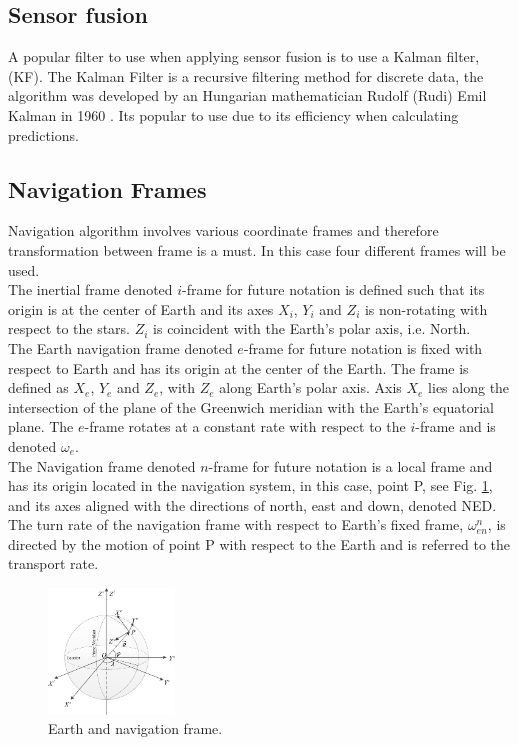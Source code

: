 \subsection{Sensor fusion}
A popular filter to use when applying sensor fusion is to use a Kalman filter, (KF). The Kalman Filter is a recursive filtering method for discrete data, the algorithm was developed by an Hungarian mathematician Rudolf (Rudi) Emil Kalman in 1960 \cite{boken}. Its popular to use due to its efficiency when calculating predictions. \cite{kf eff}

\subsection{Navigation Frames}
Navigation algorithm involves various coordinate frames and therefore transformation between frame is a must. In this case four different frames will be used.\\

The inertial frame denoted $i$-frame for future notation is defined such that its origin is at the center of Earth and its axes $X_i$, $Y_i$ and $Z_i$ is non-rotating with respect to the stars. $Z_i$ is coincident with the Earth's polar axis, i.e. North.\\

The Earth navigation frame denoted $e$-frame for future notation is fixed with respect to Earth and has its origin at the center of the Earth. The frame is defined as $X_e$, $Y_e$ and $Z_e$, with $Z_e$ along Earth's polar axis. Axis $X_e$ lies along the intersection of the plane of the Greenwich meridian with the Earth's equatorial plane. The $e$-frame rotates at a constant rate with respect to the $i$-frame and is denoted $\omega_e$.\\

The Navigation frame denoted $n$-frame for future notation is a local frame and has its origin located in the navigation system, in this case, point P, see Fig. \ref{WGS}, and its axes aligned with the directions of north, east and down, denoted NED. The turn rate of the navigation frame with respect to Earth's fixed frame, $\omega_{en}^n$, is directed by the motion of point P with respect to the Earth and is referred to the transport rate.   

\begin{figure}[H]
\centering
\includegraphics[width=0.3\textwidth]{Figures/WGS-coordinates.png}
\caption{Earth and navigation frame.}
\label{WGS}
\end{figure}

